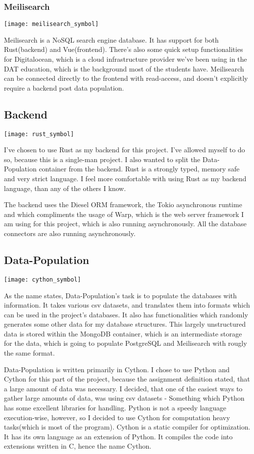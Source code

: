 \documentclass[a4paper, 12pt]{article}
\begin{document}
\subsubsection{Meilisearch}
\texttt{[image: meilisearch\_symbol]}

Meilisearch is a NoSQL search engine database. It has support for both Rust(backend) and Vue(frontend). There's also some quick setup functionalities for Digitalocean, which is a cloud infrastructure provider we've been using in the DAT education, which is the background most of the students have. Meilisearch can be connected directly to the frontend with read-access, and doesn't explicitly require a backend post data population. 

\subsection{Backend}
\texttt{[image: rust\_symbol]}

I've chosen to use Rust as my backend for this project. I've allowed myself to do so, because this is a single-man project. I also wanted to split the Data-Population container from the backend. Rust is a strongly typed, memory safe and very strict language. I feel more comfortable with using Rust as my backend language, than any of the others I know. 

The backend uses the Diesel ORM framework, the Tokio asynchronous runtime and which compliments the usage of Warp, which is the web server framework I am using for this project, which is also running asynchronously. All the database connectors are also running asynchronously.

\subsection{Data-Population}
\texttt{[image: cython\_symbol]}

As the name states, Data-Population's task is to populate the databases with information. It takes various csv datasets, and translates them into formats which can be used in the project's databases. It also has functionalities which randomly generates some other data for my database structures. This largely unstructured data is stored within the MongoDB container, which is an intermediate storage for the data, which is going to populate PostgreSQL and Meilisearch with rougly the same format. 

Data-Population is written primarily in Cython. I chose to use Python and Cython for this part of the project, because the assignment definition stated, that a large amount of data was necessary. I decided, that one of the easiest ways to gather large amounts of data, was using csv datasets - Something which Python has some excellent libraries for handling. Python is not a speedy language execution-wise, however, so I decided to use Cython for computation heavy tasks(which is most of the program). Cython is a static compiler for optimization. It has its own language as an extension of Python. It compiles the code into extensions written in C, hence the name Cython.
\end{document}
